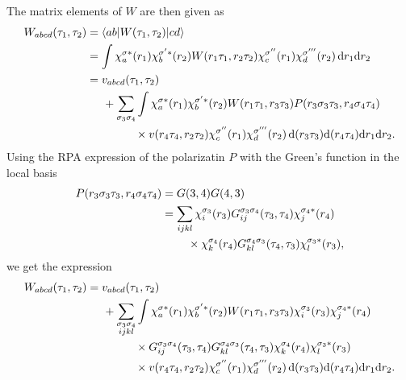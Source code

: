 \documentclass[12pt,a4paper]{scrartcl}
\numberwithin{equation}{section}
\begin{document}
The matrix elements of $W$ are then given as
\begin{align}
W_{abcd}(\tau_1,\tau_2) &= \braket{ab|W(\tau_1,\tau_2)|cd}  \\
%
&= \int \chi^{\sigma*}_a(r_1) \chi^{\sigma'*}_b(r_2)
          W(r_1\tau_1,r_2\tau_2)
        \chi^{\sigma''}_c(r_1) \chi^{\sigma'''}_d(r_2) \, \mathrm{d}r_1\mathrm{d}r_2 \\
%
&= v_{abcd}(\tau_1,\tau_2)  \nonumber \\ 
& \hspace{0.5cm}  + \sum_{\sigma_3\sigma_4}\int 
                     \chi^{\sigma*}_a(r_1) \chi^{\sigma'*}_b(r_2) W(r_1\tau_1,r_3\tau_3) 
                              P(r_3\sigma_3\tau_3,r_4\sigma_4\tau_4)  \nonumber \\
&  \hspace{1.5cm}\times       v(r_4\tau_4,r_2\tau_2) \chi^{\sigma''}_c(r_1) \chi^{\sigma'''}_d(r_2)
                             \, \mathrm{d}(r_3\tau_3)\mathrm{d}(r_4\tau_4) \mathrm{d}r_1\mathrm{d}r_2.
%
\end{align}
Using the RPA expression of the polarizatin $P$ with the Green's function in the local basis
\begin{align}
 P(r_3\sigma_3\tau_3,r_4\sigma_4\tau_4)
 &=  G(3,4)G(4,3)                         \\
%
&= \sum_{ijkl} \chi_{i}^{\sigma_3}(r_3) G^{\sigma_3\sigma_4}_{ij}(\tau_3,\tau_4)\chi_{j}^{\sigma_4*}(r_4) \nonumber \\
& \hspace{0.8cm} \times \chi_{k}^{\sigma_4}(r_4) G^{\sigma_4\sigma_3}_{kl}(\tau_4,\tau_3)\chi_{l}^{\sigma_3*}(r_3),
\end{align}
we get the expression
\begin{align}
W_{abcd}(\tau_1,\tau_2) 
%
&= v_{abcd}(\tau_1,\tau_2)  \nonumber \\ 
& \hspace{0.5cm}  + \sum_{\substack{\sigma_3\sigma_4 \\ ijkl }}\int 
                     \chi^{\sigma*}_a(r_1) \chi^{\sigma'*}_b(r_2) W(r_1\tau_1,r_3\tau_3) 
                              \chi_{i}^{\sigma_3}(r_3) \chi_{j}^{\sigma_4*}(r_4)  \nonumber \\
&  \hspace{1.5cm}\times       G^{\sigma_3\sigma_4}_{ij}(\tau_3,\tau_4) G^{\sigma_4\sigma_3}_{kl}(\tau_4,\tau_3)
                              \chi_{k}^{\sigma_4}(r_4)\chi_{l}^{\sigma_3*}(r_3) \nonumber \\
&  \hspace{1.5cm}\times       v(r_4\tau_4,r_2\tau_2) \chi^{\sigma''}_c(r_1) \chi^{\sigma'''}_d(r_2)
                             \, \mathrm{d}(r_3\tau_3)\mathrm{d}(r_4\tau_4) \mathrm{d}r_1\mathrm{d}r_2.
%
\end{align}
\end{document}
